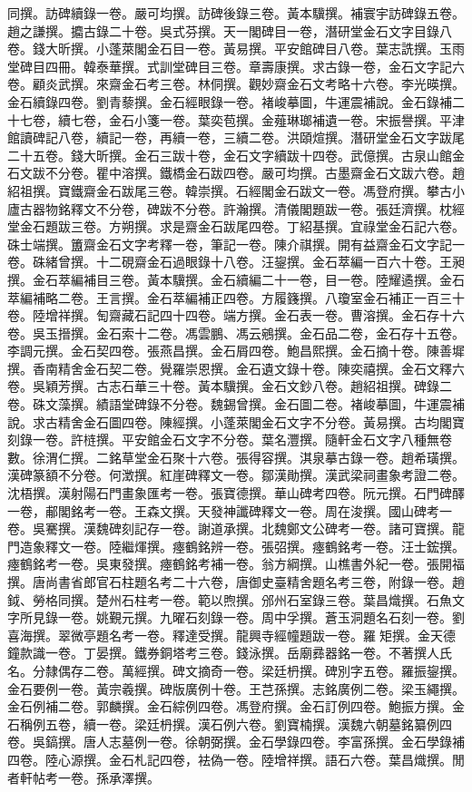 \begin{pinyinscope}
同撰。訪碑續錄一卷。嚴可均撰。訪碑後錄三卷。黃本驥撰。補寰宇訪碑錄五卷。趙之謙撰。攟古錄二十卷。吳式芬撰。天一閣碑目一卷，潛研堂金石文字目錄八卷。錢大昕撰。小蓬萊閣金石目一卷。黃易撰。平安館碑目八卷。葉志詵撰。玉雨堂碑目四冊。韓泰華撰。式訓堂碑目三卷。章壽康撰。求古錄一卷，金石文字記六卷。顧炎武撰。來齋金石考三卷。林侗撰。觀妙齋金石文考略十六卷。李光暎撰。金石續錄四卷。劉青藜撰。金石經眼錄一卷。褚峻摹圖，牛運震補說。金石錄補二十七卷，續七卷，金石小箋一卷。葉奕苞撰。金薤琳瑯補遺一卷。宋振譽撰。平津館讀碑記八卷，續記一卷，再續一卷，三續二卷。洪頤煊撰。潛研堂金石文字跋尾二十五卷。錢大昕撰。金石三跋十卷，金石文字續跋十四卷。武億撰。古泉山館金石文跋不分卷。瞿中溶撰。鐵橋金石跋四卷。嚴可均撰。古墨齋金石文跋六卷。趙紹祖撰。寶鐵齋金石跋尾三卷。韓崇撰。石經閣金石跋文一卷。馮登府撰。攀古小廬古器物銘釋文不分卷，碑跋不分卷。許瀚撰。清儀閣題跋一卷。張廷濟撰。枕經堂金石題跋三卷。方朔撰。求是齋金石跋尾四卷。丁紹基撰。宜祿堂金石記六卷。硃士端撰。簠齋金石文字考釋一卷，筆記一卷。陳介祺撰。開有益齋金石文字記一卷。硃緒曾撰。十二硯齋金石過眼錄十八卷。汪鋆撰。金石萃編一百六十卷。王昶撰。金石萃編補目三卷。黃本驥撰。金石續編二十一卷，目一卷。陸耀遹撰。金石萃編補略二卷。王言撰。金石萃編補正四卷。方履籛撰。八瓊室金石補正一百三十卷。陸增祥撰。匋齋藏石記四十四卷。端方撰。金石表一卷。曹溶撰。金石存十六卷。吳玉搢撰。金石索十二卷。馮雲鵬、馮云鵷撰。金石品二卷，金石存十五卷。李調元撰。金石契四卷。張燕昌撰。金石屑四卷。鮑昌熙撰。金石摘十卷。陳善墀撰。香南精舍金石契二卷。覺羅崇恩撰。金石遺文錄十卷。陳奕禧撰。金石文釋六卷。吳穎芳撰。古志石華三十卷。黃本驥撰。金石文鈔八卷。趙紹祖撰。碑錄二卷。硃文藻撰。績語堂碑錄不分卷。魏錫曾撰。金石圖二卷。褚峻摹圖，牛運震補說。求古精舍金石圖四卷。陳經撰。小蓬萊閣金石文字不分卷。黃易撰。古均閣寶刻錄一卷。許梿撰。平安館金石文字不分卷。葉名灃撰。隨軒金石文字八種無卷數。徐渭仁撰。二銘草堂金石聚十六卷。張得容撰。淇泉摹古錄一卷。趙希璜撰。漢碑篆額不分卷。何澂撰。紅崖碑釋文一卷。鄒漢勛撰。漢武梁祠畫象考證二卷。沈梧撰。漢射陽石門畫象匯考一卷。張寶德撰。華山碑考四卷。阮元撰。石門碑醳一卷，郙閣銘考一卷。王森文撰。天發神讖碑釋文一卷。周在浚撰。國山碑考一卷。吳騫撰。漢魏碑刻記存一卷。謝道承撰。北魏鄭文公碑考一卷。諸可寶撰。龍門造象釋文一卷。陸繼煇撰。瘞鶴銘辨一卷。張弨撰。瘞鶴銘考一卷。汪士鋐撰。瘞鶴銘考一卷。吳東發撰。瘞鶴銘考補一卷。翁方綱撰。山樵書外紀一卷。張開福撰。唐尚書省郎官石柱題名考二十六卷，唐御史臺精舍題名考三卷，附錄一卷。趙鉞、勞格同撰。楚州石柱考一卷。範以煦撰。邠州石室錄三卷。葉昌熾撰。石魚文字所見錄一卷。姚覲元撰。九曜石刻錄一卷。周中孚撰。蒼玉洞題名石刻一卷。劉喜海撰。翠微亭題名考一卷。釋達受撰。龍興寺經幢題跋一卷。羅矩撰。金天德鐘款識一卷。丁晏撰。鐵券銅塔考三卷。錢泳撰。岳廟彞器銘一卷。不著撰人氏名。分隸偶存二卷。萬經撰。碑文摘奇一卷。梁廷枬撰。碑別字五卷。羅振鋆撰。金石要例一卷。黃宗羲撰。碑版廣例十卷。王芑孫撰。志銘廣例二卷。梁玉繩撰。金石例補二卷。郭麟撰。金石綜例四卷。馮登府撰。金石訂例四卷。鮑振方撰。金石稱例五卷，續一卷。梁廷枬撰。漢石例六卷。劉寶楠撰。漢魏六朝墓銘纂例四卷。吳鎬撰。唐人志墓例一卷。徐朝弼撰。金石學錄四卷。李富孫撰。金石學錄補四卷。陸心源撰。金石札記四卷，袪偽一卷。陸增祥撰。語石六卷。葉昌熾撰。閒者軒帖考一卷。孫承澤撰。
\end{pinyinscope}
